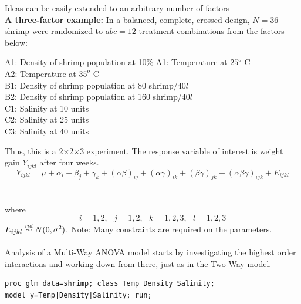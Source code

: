\Large Ideas can be easily extended to an arbitrary number of factors\large\\
\textbf{A three-factor example:}
In a balanced, complete, crossed design, $N=36$ shrimp were randomized to $abc=12$ treatment combinations from the factors below:
\begin{tabbing}
A1: \= Density of shrimp population at  10\% \kill
A1: \> Temperature at $25^o$ C \\
A2: \> Temperature at $35^o$ C \\
B1: \> Density of shrimp population at 80 shrimp/$40l$ \\
B2: \> Density of shrimp population at 160 shrimp/$40l$ \\
C1: \> Salinity at 10 units \\
C2: \> Salinity at 25 units \\
C3: \> Salinity at 40 units 
\end{tabbing}
Thus, this is a 2$\times$2$\times$3 experiment.  The response variable of interest is weight gain $Y_{ijkl}$ after
four weeks.
$$Y_{ijkl} = \mu + \alpha_i + \beta_j + \gamma_k + (\alpha \beta)_{ij} + (\alpha \gamma)_{ik} + (\beta \gamma)_{jk}  + (\alpha \beta \gamma)_{ijk} + E_{ijkl}$$~\\~\\
where 
$$i = 1,2, ~~~j=1,2,~~~k=1,2,3,~~~l=1,2,3$$
$E_{ijkl} \stackrel{iid}{\sim} N(0,\sigma^2).$  Note:  Many constraints are required on the parameters.\\~\\

Analysis of a Multi-Way ANOVA model starts by investigating the highest order interactions and working down from there, just as in the Two-Way model.

\newpage


\begin{small}
\begin{verbatim}
proc glm data=shrimp; class Temp Density Salinity;
model y=Temp|Density|Salinity; run;
\end{verbatim}
\end{small}

